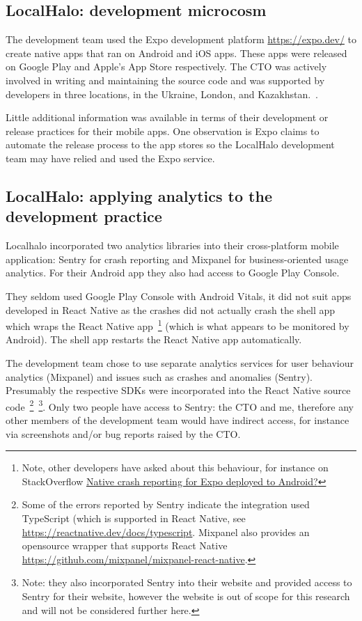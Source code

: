 \subsection{LocalHalo: development microcosm}
The development team used the Expo development platform \url{https://expo.dev/} to create native apps that ran on Android and iOS apps. These apps were released on Google Play and Apple's App Store respectively. The CTO was actively involved in writing and maintaining the source code and was supported by developers in three locations, in the Ukraine, London, and Kazakhstan.~\citep{karpenko2019_localhalo_a_social_network_for_neighbors}. 

Little additional information was available in terms of their development or release practices for their mobile apps. One observation is Expo claims to automate the release process to the app stores so the LocalHalo development team may have relied and used the Expo service.

\subsection{LocalHalo: applying analytics to the development practice}
Localhalo incorporated two analytics libraries into their cross-platform mobile application: Sentry for crash reporting and Mixpanel for business-oriented usage analytics. For their Android app they also had access to Google Play Console.

They seldom used Google Play Console with Android Vitals, it did not suit apps developed in React Native as the crashes did not actually crash the shell app which wraps the React Native app~\footnote{Note, other developers have asked about this behaviour, for instance on StackOverflow \href{https://stackoverflow.com/questions/66166824/native-crash-reporting-for-expo-deployed-to-android/}{Native crash reporting for Expo deployed to Android?}} 
(which is what appears to be monitored by Android). The shell app restarts the React Native app automatically.

The development team chose to use separate analytics services for user behaviour analytics (Mixpanel) and issues such as crashes and anomalies (Sentry). Presumably the respective SDKs were incorporated into the React Native source code~\footnote{Some of the errors reported by Sentry indicate the integration used TypeScript (which is supported in React Native, see \url{https://reactnative.dev/docs/typescript}. Mixpanel also provides an opensource wrapper that supports React Native \url{https://github.com/mixpanel/mixpanel-react-native}.}~\footnote{Note: they also incorporated Sentry into their website and provided access to Sentry for their website, however the website is out of scope for this research and will not be considered further here.}. Only two people have access to Sentry: the CTO and me, therefore any other members of the development team would have indirect access, for instance via screenshots and/or bug reports raised by the CTO. 

